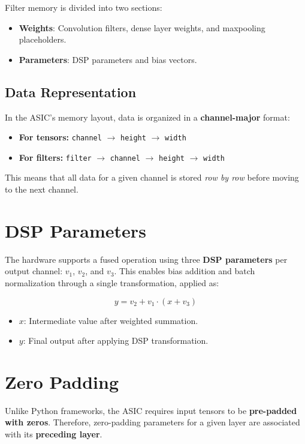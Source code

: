 \documentclass[12pt]{report}
\begin{document}
Filter memory is divided into two sections:

\begin{itemize}
    \item \textbf{Weights}: Convolution filters, dense layer weights, and maxpooling placeholders.
    \item \textbf{Parameters}: DSP parameters and bias vectors.
\end{itemize}

\subsection{Data Representation}
In the ASIC’s memory layout, data is organized in a \textbf{channel-major} format:

\begin{itemize}
    \item \textbf{For tensors:} \texttt{channel} $\rightarrow$ \texttt{height} $\rightarrow$ \texttt{width}
    \item \textbf{For filters:} \texttt{filter} $\rightarrow$ \texttt{channel} $\rightarrow$ \texttt{height} $\rightarrow$ \texttt{width}
\end{itemize}

This means that all data for a given channel is stored \textit{row by row} before moving to the next channel.

\section{DSP Parameters}

The hardware supports a fused operation using three \textbf{DSP parameters} per output channel: $v_1$, $v_2$, and $v_3$. This enables bias addition and batch normalization through a single transformation, applied as:

\[
y = v_2 + v_1 \cdot (x + v_3)
\]

\begin{itemize}
    \item $x$: Intermediate value after weighted summation.
    \item $y$: Final output after applying DSP transformation.
\end{itemize}

\section{Zero Padding}

Unlike Python frameworks, the ASIC requires input tensors to be \textbf{pre-padded with zeros}. Therefore, zero-padding parameters for a given layer are associated with its \textbf{preceding layer}.
\end{document}
